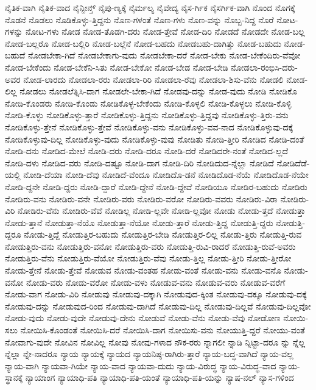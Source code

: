 {ನೈತಿಕ-ವಾಗಿ
ನೈತಿಕ-ವಾದ
ನೈನ್ಟೀನ್ತ್
ನೈಪು-ಣ್ಯಕ್ಕೆ
ನೈರ್ಮಲ್ಯ
ನೈವೇದ್ಯ
ನೈಸ-ರ್ಗಿಕ
ನೈಸರ್ಗಿಕ-ವಾಗಿ
ನೊಂದ
ನೊಗಕ್ಕೆ
ನೊಡನೆ
ನೊಡಲು
ನೊಡಿಕೊಳ್ಳು-ತ್ತಿದ್ದನು
ನೊಣ-ಗಳಂತೆ
ನೊಣ-ಗಳು
ನೊಣ-ವನ್ನು
ನೊಬ್ಬ-ನಿದ್ದ
ನೊರೆ
ನೋಟ-ಗಳನ್ನು
ನೋಟ-ಗಳು
ನೋಡ
ನೋಡ-ತೊಡಗಿ-ದರು
ನೋಡ-ತ್ತೇವೆ
ನೋಡ-ದಿರಿ
ನೋಡದೆ
ನೋಡದೇ
ನೋಡ-ಬಲ್ಲ
ನೋಡ-ಬಲ್ಲರೊ
ನೋಡ-ಬಲ್ಲಿರಿ
ನೋಡ-ಬಲ್ಲೆನೆ
ನೋಡ-ಬಹದು
ನೋಡಬಹು-ದಾಗಿತ್ತು
ನೋಡ-ಬಹುದು
ನೋಡ-ಬಹುದೆ
ನೋಡಬೇಕಾ-ಗಿದೆ
ನೋಡಬೇಕಾಗು-ವುದು
ನೋಡಬೇಕಾ-ದರೆ
ನೋಡ-ಬೇಕು
ನೋಡ-ಬೇಕೆಂದಿರು-ವೆವೋ
ನೋಡ-ಬೇಕೆಂದು
ನೋಡ-ಬೇಕೆನಿ-ಸಿತು
ನೋಡ-ಬೇಕೋ
ನೋಡ-ಬೇಡ
ನೋಡ-ಬೇಡಿ
ನೋಡಲಾ-ರಂಭಿಸಿ-ದರು-ಅವರ
ನೋಡ-ಲಾರದು
ನೋಡಲಾ-ರರು
ನೋಡಲಾ-ರಿರಿ
ನೋಡಲಾ-ರೆವು
ನೋಡಲಾ-ಶಿಸು-ವೆನು
ನೋಡಲಿ
ನೋಡ-ಲಿಲ್ಲ
ನೋಡಲು
ನೋಡಲೆತ್ನಿಸಿ-ದಾಗ
ನೋಡಲೇ-ಬೇಕಾ-ಗಿದೆ
ನೋಡವು-ದನ್ನು
ನೋಡ-ವುದು
ನೋಡಿ
ನೋಡಿಕೊ
ನೋಡಿ-ಕೊಂಡರು
ನೋಡಿ-ಕೊಂಡು
ನೋಡಿಕೊಳ್ಳ-ಬೇಕೆಂದು
ನೋಡಿ-ಕೊಳ್ಳಲಿ
ನೋಡಿ-ಕೊಳ್ಳಲು
ನೋಡಿ-ಕೊಳ್ಳಿ
ನೋಡಿ-ಕೊಳ್ಳು
ನೋಡಿಕೊಳ್ಳು-ತ್ತಾರೆ
ನೋಡಿಕೊಳ್ಳು-ತ್ತಿದ್ದನು
ನೋಡಿಕೊಳ್ಳು-ತ್ತಿದ್ದವು
ನೋಡಿಕೊಳ್ಳು-ತ್ತಿರು-ವನು
ನೋಡಿಕೊಳ್ಳು-ತ್ತೇನೆ
ನೋಡಿಕೊಳ್ಳು-ತ್ತೇವೆ
ನೋಡಿಕೊಳ್ಳು-ವನು
ನೋಡಿಕೊಳ್ಳು-ವವ-ನಾದ
ನೋಡಿಕೊಳ್ಳುವು-ದಕ್ಕೆ
ನೋಡಿಕೊಳ್ಳುವು-ದಿಲ್ಲ
ನೋಡಿಕೊಳ್ಳು-ವುದು
ನೋಡಿಕೊಳ್ಳು-ವುವು
ನೋಡಿತು
ನೋಡಿ-ತ್ತೀರಿ
ನೋಡಿದ
ನೋಡಿ-ದಂತೆ
ನೋಡಿ-ದನು
ನೋಡಿದ-ಮೇಲೆ
ನೋಡಿ-ದರು
ನೋಡಿ-ದರೂ
ನೋಡಿ-ದರೆ
ನೋಡಿದರೇ-ನಂತೆ
ನೋಡಿದ-ಲ್ಲದೆ
ನೋಡಿ-ದಳು
ನೋಡಿದ-ವರು
ನೋಡಿ-ದಷ್ಟೂ
ನೋಡಿ-ದಾಗ
ನೋಡಿ-ದಿರಿ
ನೋಡಿದುದ-ನ್ನೆಲ್ಲಾ
ನೋಡಿದೆ
ನೋಡಿದೆಡೆ-ಯಲ್ಲಿ
ನೋಡಿ-ದೆಯಾ
ನೋಡಿ-ದೆವು
ನೋಡಿದೆ-ವೆಂದೂ
ನೋಡಿದೊ-ಡನೆ
ನೋಡಿದೊಡ-ನೆಯೆ
ನೋಡಿದೊಡ-ನೆಯೇ
ನೋಡಿ-ದ್ದನೇ
ನೋಡಿ-ದ್ದರು
ನೋಡಿ-ದ್ದಾರೆ
ನೋಡಿ-ದ್ದೇನೆ
ನೋಡಿ-ದ್ದೇವೆ
ನೋಡಿಯೂ
ನೋಡಿರ-ಬಹುದು
ನೋಡಿರು
ನೋಡಿರು-ವನು
ನೋಡಿರು-ವನೇ
ನೋಡಿರು-ವರು
ನೋಡಿರು-ವರೋ
ನೋಡಿರು-ವವರು
ನೋಡಿರು-ವಿರಾ
ನೋಡಿರು-ವಿರಿ
ನೋಡಿರು-ವೆನು
ನೋಡಿರು-ವೆವೆ
ನೋಡಿಲ್ಲ
ನೋಡಿ-ಲ್ಲವೇ
ನೋಡಿ-ಲ್ಲವೋ
ನೋಡು
ನೋಡು-ತ್ತದೆ
ನೋಡುತ್ತಾ
ನೋಡು-ತ್ತಾನೆ
ನೋಡುತ್ತಾ-ನೆಯೊ
ನೋಡುತ್ತಾ-ನೆಯೋ
ನೋಡು-ತ್ತಾರೆ
ನೋಡು-ತ್ತಿದ್ದ
ನೋಡುತ್ತಿ-ದ್ದರು
ನೋಡುತ್ತಿ-ದ್ದರೂ
ನೋಡು-ತ್ತಿದ್ದೆ
ನೋಡುತ್ತಿರ-ಬಹುದು
ನೋಡುತ್ತಿರ-ಬೇಡಿ
ನೋಡುತ್ತಿರ-ಲಿಲ್ಲ
ನೋಡು-ತ್ತಿರು
ನೋಡುತ್ತಿ-ರುವ
ನೋಡುತ್ತಿರು-ವನು
ನೋಡುತ್ತಿರು-ವನೋ
ನೋಡುತ್ತಿರು-ವರು
ನೋಡುತ್ತಿ-ರುವಿ-ರಾದರೆ
ನೋಡುತ್ತಿ-ರುವೆ-ಅವರು
ನೋಡುತ್ತಿರು-ವೆನು
ನೋಡುತ್ತಿರು-ವೆಯೋ
ನೋಡುತ್ತಿರು-ವೆವು
ನೋಡು-ತ್ತಿಲ್ಲ
ನೋಡು-ತ್ತೀರಿ
ನೋಡು-ತ್ತೀರೋ
ನೋಡು-ತ್ತೇನೆ
ನೋಡು-ತ್ತೇವೆ
ನೋಡುವ
ನೋಡು-ವಂತಹ
ನೋಡು-ವಂತೆ
ನೋಡು-ವನು
ನೋಡು-ವನೊ
ನೋಡು-ವನೋ
ನೋಡು-ವರು
ನೋಡು-ವರೋ
ನೋಡು-ವಳು
ನೋಡುವ-ವನು
ನೋಡುವ-ವರು
ನೋಡುವ-ವರೆಗೆ
ನೋಡು-ವಾಗ
ನೋಡು-ವಿರಿ
ನೋಡುವು
ನೋಡುವು-ದಕ್ಕಾಗಿ
ನೋಡುವುದ-ಕ್ಕಿಂತ
ನೋಡುವು-ದಕ್ಕೂ
ನೋಡುವು-ದಕ್ಕೆ
ನೋಡುವು-ದನ್ನು
ನೋಡುವುದ-ರಿಂದ
ನೋಡುವು-ದಾಗಿದೆ
ನೋಡುವು-ದಿಲ್ಲ
ನೋಡುವು-ದಿಲ್ಲವೆ
ನೋಡುವು-ದಿಲ್ಲವೋ
ನೋಡು-ವುದು
ನೋಡು-ವುದೇ
ನೋಡುವು-ದೇನು
ನೋಡುವೆ
ನೋಡು-ವೆನು
ನೋಡು-ವೆವು
ನೋಡೋಣ
ನೋಯಿ-ಸಲು
ನೋಯಿಸಿ-ಕೊಂಡಂತೆ
ನೋಯಿಸಿ-ದರೆ
ನೋಯಿಸಿ-ದಾಗ
ನೋಯಿಸು-ವನು
ನೋಯುತ್ತಿ-ದ್ದರೆ
ನೋಯು-ವಂತೆ
ನೋವಾಗು-ವುದೇ
ನೋವಿನ
ನೋವಿಲ್ಲ
ನೋವು
ನೋವು-ಗಳಾದ
ನೌಕ-ರರು
ನ್ನಾಗಲೀ
ನ್ನಾಡಿ
ನ್ನಿಟ್ಟಾ-ದರೂ
ನ್ನು
ನ್ನೆಲ್ಲ
ನ್ನೆಲ್ಲಾ
ನ್ನೇ-ನಾದರೂ
ನ್ಯಾಯ
ನ್ಯಾಯಕ್ಕೆ
ನ್ಯಾಯದ
ನ್ಯಾಯನಿಷ್ಠ-ರಾಗಿರು-ತ್ತಾರೆ
ನ್ಯಾಯ-ಬದ್ಧ-ವಾಗಿದೆ
ನ್ಯಾಯ-ವಲ್ಲ
ನ್ಯಾಯ-ವಾಗಿ
ನ್ಯಾಯವಾ-ಗಿಯೇ
ನ್ಯಾಯ-ವಾದ
ನ್ಯಾಯವಾ-ದುದು
ನ್ಯಾಯ-ವಿರುದ್ಧ
ನ್ಯಾಯ-ವಿರುದ್ಧ-ವಾದ
ನ್ಯಾಯ-ಸ್ಥಾನಕ್ಕೆ
ನ್ಯಾಯಾಂಗ
ನ್ಯಾಯಾಧಿ-ಪತಿ
ನ್ಯಾಯಾಧಿ-ಪತಿ-ಯಂತೆ
ನ್ಯಾಯಾಧಿ-ಪತಿ-ಯನ್ನು
ನ್ಯಾಷ-ನಲ್
ನ್ಯಾಸ-ಗಳಿಂದ
}
